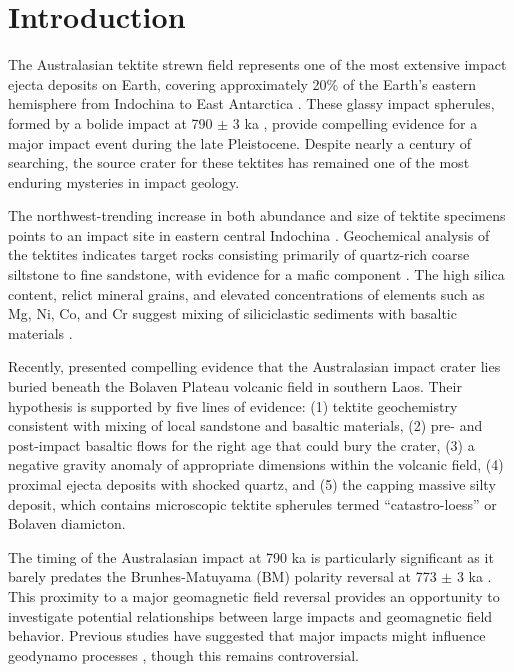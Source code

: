 \documentclass[twocolumn,11pt]{article}
\begin{document}
\section{Introduction}

The Australasian tektite strewn field represents one of the most extensive impact ejecta deposits on Earth, covering approximately 20\% of the Earth's eastern hemisphere from Indochina to East Antarctica \citep{Glass1994}. These glassy impact spherules, formed by a bolide impact at 790 $\pm$ 3 ka \citep{Schwarz2016, Jourdan2019}, provide compelling evidence for a major impact event during the late Pleistocene. Despite nearly a century of searching, the source crater for these tektites has remained one of the most enduring mysteries in impact geology.

The northwest-trending increase in both abundance and size of tektite specimens points to an impact site in eastern central Indochina \citep{Glass1994, Ford1988}. Geochemical analysis of the tektites indicates target rocks consisting primarily of quartz-rich coarse siltstone to fine sandstone, with evidence for a mafic component \citep{Koeberl1992, Wasson1991}. The high silica content, relict mineral grains, and elevated concentrations of elements such as Mg, Ni, Co, and Cr suggest mixing of siliciclastic sediments with basaltic materials \citep{Amare2006, Goderis2017}.

Recently, \citet{Sieh2019} presented compelling evidence that the Australasian impact crater lies buried beneath the Bolaven Plateau volcanic field in southern Laos. Their hypothesis is supported by five lines of evidence: (1) tektite geochemistry consistent with mixing of local sandstone and basaltic materials, (2) pre- and post-impact basaltic flows for the right age that could bury the crater, (3) a negative gravity anomaly of appropriate dimensions within the volcanic field, (4) proximal ejecta deposits with shocked quartz, and (5) the capping massive silty deposit, which contains microscopic tektite spherules termed “catastro-loess” or Bolaven diamicton.

The timing of the Australasian impact at 790 ka is particularly significant as it barely predates the Brunhes-Matuyama (BM) polarity reversal at 773 $\pm$ 3 ka \citep{Singer2019}. This proximity to a major geomagnetic field reversal provides an opportunity to investigate potential relationships between large impacts and geomagnetic field behavior. Previous studies have suggested that major impacts might influence geodynamo processes \citep{Muller1986}, though this remains controversial.
\end{document}
